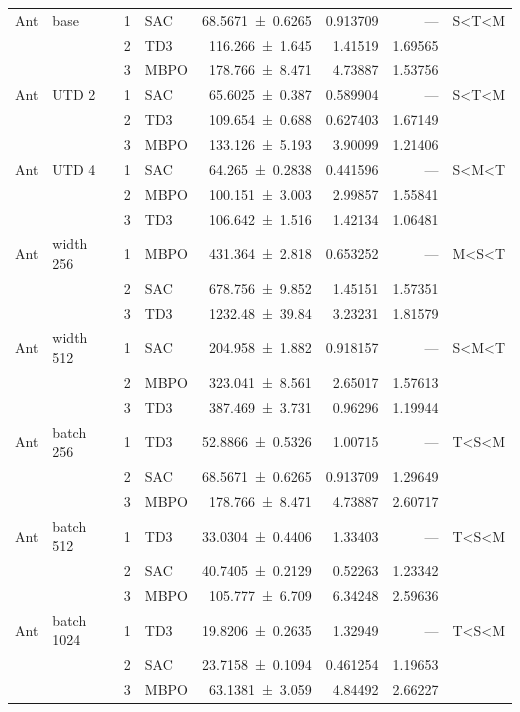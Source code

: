 {\begin{longtable}{@{}llrlrrrl@{}}
    \midrule
    Ant & base & \num{1} & SAC & \num{68.5671+-0.6265} & \num{0.913709} & --- & S<T<M \\
     &  & \num{2} & TD3 & \num{116.266+-1.645} & \num{1.41519} & \num{1.69565} &  \\
     &  & \num{3} & MBPO & \num{178.766+-8.471} & \num{4.73887} & \num{1.53756} &  \\
    Ant & UTD 2 & \num{1} & SAC & \num{65.6025+-0.387} & \num{0.589904} & --- & S<T<M \\
     &  & \num{2} & TD3 & \num{109.654+-0.688} & \num{0.627403} & \num{1.67149} &  \\
     &  & \num{3} & MBPO & \num{133.126+-5.193} & \num{3.90099} & \num{1.21406} &  \\
    Ant & UTD 4 & \num{1} & SAC & \num{64.265+-0.2838} & \num{0.441596} & --- & S<M<T \\
     &  & \num{2} & MBPO & \num{100.151+-3.003} & \num{2.99857} & \num{1.55841} &  \\
     &  & \num{3} & TD3 & \num{106.642+-1.516} & \num{1.42134} & \num{1.06481} &  \\
    Ant & width 256 & \num{1} & MBPO & \num{431.364+-2.818} & \num{0.653252} & --- & M<S<T \\
     &  & \num{2} & SAC & \num{678.756+-9.852} & \num{1.45151} & \num{1.57351} &  \\
     &  & \num{3} & TD3 & \num{1232.48+-39.84} & \num{3.23231} & \num{1.81579} &  \\
    Ant & width 512 & \num{1} & SAC & \num{204.958+-1.882} & \num{0.918157} & --- & S<M<T \\
     &  & \num{2} & MBPO & \num{323.041+-8.561} & \num{2.65017} & \num{1.57613} &  \\
     &  & \num{3} & TD3 & \num{387.469+-3.731} & \num{0.96296} & \num{1.19944} &  \\
    Ant & batch 256 & \num{1} & TD3 & \num{52.8866+-0.5326} & \num{1.00715} & --- & T<S<M \\
     &  & \num{2} & SAC & \num{68.5671+-0.6265} & \num{0.913709} & \num{1.29649} &  \\
     &  & \num{3} & MBPO & \num{178.766+-8.471} & \num{4.73887} & \num{2.60717} &  \\
    Ant & batch 512 & \num{1} & TD3 & \num{33.0304+-0.4406} & \num{1.33403} & --- & T<S<M \\
     &  & \num{2} & SAC & \num{40.7405+-0.2129} & \num{0.52263} & \num{1.23342} &  \\
     &  & \num{3} & MBPO & \num{105.777+-6.709} & \num{6.34248} & \num{2.59636} &  \\
    Ant & batch 1024 & \num{1} & TD3 & \num{19.8206+-0.2635} & \num{1.32949} & --- & T<S<M \\
     &  & \num{2} & SAC & \num{23.7158+-0.1094} & \num{0.461254} & \num{1.19653} &  \\
     &  & \num{3} & MBPO & \num{63.1381+-3.059} & \num{4.84492} & \num{2.66227} &  \\
  \end{longtable}
}

